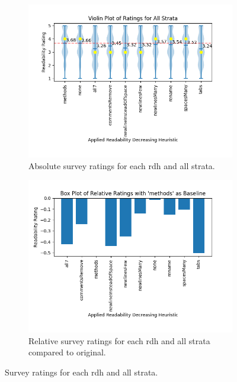 \documentclass[%
class=scrreprt,
chapterprefix=false,%
open=right,%
twoside=false,%
paper=a4,%
logofile={Logo\_zentral\_farbig\_EN.png},%
thesistype=master,%
UKenglish,%
]{se2thesis}
\theoremstyle{definition}
\begin{document}
	\begin{figure}[p]
		\centering
		\begin{subfigure}{\linewidth}
			\includegraphics[width=\textwidth]{img/survey_ratings_violin_all.png}
			\caption{Absolute survey ratings for each rdh and all strata.}
			\label{fig:survey_ratings_violin_all}
		\end{subfigure}
		\hfill
		\begin{subfigure}{\textwidth}
			\includegraphics[width=\linewidth]{img/survey_ratings_bar_all.png}
			\caption{Relative survey ratings for each rdh and all strata compared to original.}
			\label{fig:survey_ratings_bar_all}
		\end{subfigure}
		\caption{Survey ratings for each rdh and all strata.}
		\label{fig:survey_time_all}
	\end{figure}
	
\end{document}
